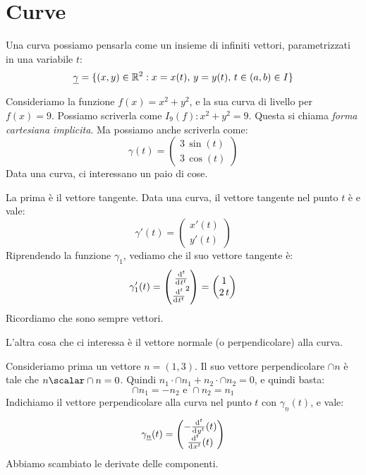 \section{Curve}

Una curva possiamo pensarla come un insieme di infiniti vettori, parametrizzati in una 
variabile $t$:
\[
        \underline{\gamma} = \{ (x,y) \in \mathbb{R}^2 : x = x(t), \, y = y(t), \, t \in \left( {a}, {b} \right) \in I \}
\]


Consideriamo la funzione $f(x) = x^2 + y^2$, e la sua curva di livello per $f(x) = 9$.
Possiamo scriverla come $I_9(f) : x^2 + y^2 = 9$. Questa si chiama \emph{forma cartesiana implicita}.
Ma possiamo anche scriverla come:
\[
\gamma (t) = \begin{pmatrix} 3 \, \sin(t) \\ 3 \, \cos(t) \end{pmatrix}
\]
Data una curva, ci interessano un paio di cose.

La prima \`e il vettore tangente. Data una curva, il vettore tangente nel punto $t$ \`e  e vale:
\[
\gamma'(t) = \begin{pmatrix} x'(t) \\ y'(t) \end{pmatrix}
\]
Riprendendo la funzione $\gamma_1$, vediamo che il suo vettore tangente \`e:
\[
\gamma_1'(t) = \begin{pmatrix} \deriv[t] t \\ \deriv[t] t^2 \end{pmatrix} = 
\begin{pmatrix} 1 \\ 2 \, t \end{pmatrix}
\]
Ricordiamo che sono sempre vettori.

L'altra cosa che ci interessa \`e il vettore normale (o perpendicolare) alla curva.

Consideriamo prima un vettore $n = (1,3)$. Il suo vettore perpendicolare $\cap{n}$ \`e tale che
$n \scalar \cap{n} = 0$. Quindi $n_1 \cdot \cap{n_1} + n_2 \cdot \cap{n_2} = 0$, e quindi basta:
\[
        \cap{n_1} = - n_2 \text{ e } \cap{n_2} = n_1
\]
Indichiamo il vettore perpendicolare alla curva nel punto $t$ con $\gamma_{\underline{n}}(t)$, e vale:
\[
\gamma_{\underline{n}} (t) = \begin{pmatrix} - \deriv[t] y(t) \\ \deriv[t] x(t) \end{pmatrix}
\]
Abbiamo scambiato le derivate delle componenti.




